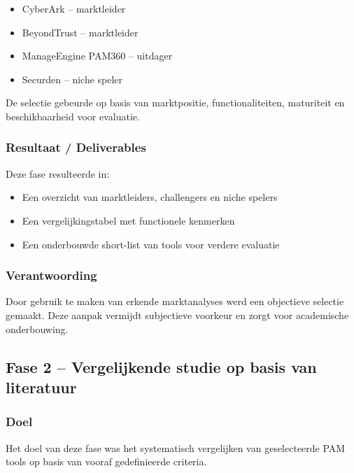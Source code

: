 \begin{itemize}
	\item CyberArk – marktleider
	\item BeyondTrust – marktleider
	\item ManageEngine PAM360 – uitdager
	\item Securden – niche speler
\end{itemize}

De selectie gebeurde op basis van marktpositie, functionaliteiten, maturiteit en beschikbaarheid voor evaluatie.

\subsubsection{Resultaat / Deliverables}
Deze fase resulteerde in:
\begin{itemize}
	\item Een overzicht van marktleiders, challengers en niche spelers
	\item Een vergelijkingstabel met functionele kenmerken
	\item Een onderbouwde short-list van tools voor verdere evaluatie
\end{itemize}

\subsubsection{Verantwoording}
Door gebruik te maken van erkende marktanalyses werd een objectieve selectie gemaakt. Deze aanpak vermijdt subjectieve voorkeur en zorgt voor academische onderbouwing.

\subsection{Fase 2 – Vergelijkende studie op basis van literatuur}

\subsubsection{Doel}
Het doel van deze fase was het systematisch vergelijken van geselecteerde PAM tools op basis van vooraf gedefinieerde criteria.
